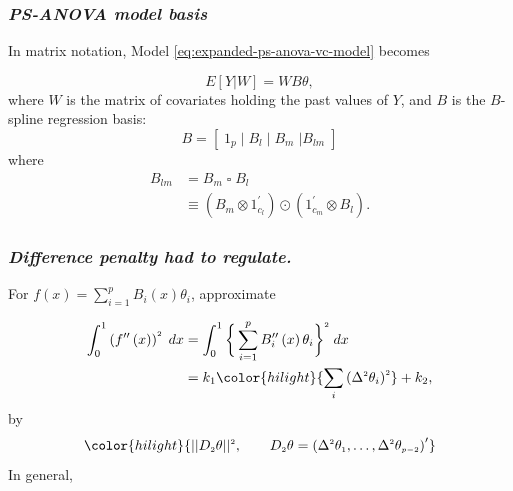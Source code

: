 \documentclass[12pt]{beamer}
\newcommand{\newthought}[1]{{\small \color{hilight} {#1}}}
\newcommand{\newmaththought}[1]{{ \color{hilight} {#1}}}
\newcommand{\ms}{\scriptscriptstyle}
\begin{document}
\begin{frame}
\frametitle{\emph{PS-ANOVA model basis}}

In matrix notation, Model \ref{eq:expanded-ps-anova-vc-model} becomes

\begin{equation*}  
E \left[ Y | W \right] = WB \theta,
\end{equation*}
\noindent
where $W$ is the matrix of covariates holding the past values of $Y$, and $B$ is the $B$-spline regression basis:
\begin{equation} \label{eq:SANOVA-basis-matrix}
B = \left[\; 1_p \; \vert \;  B_l  \; \vert \;   B_m \; \vert B_{lm} \; \right]
\end{equation}
\noindent
where 
\begin{align*} \label{eq:rowwise-kronecker-product}
B_{lm} &= B_m \; \square \; B_l \\
&\equiv \left( B_m \otimes 1^\prime_{c_l} \right) \odot \left(1^\prime_{c_m} \otimes  B_l  \right).
\end{align*}
\end{frame}






\begin{frame}
\frametitle{\emph{Difference penalty had to regulate.}}

For $f\left(x\right)=\sum \limits_{i=1}^{p} B_{i}\left(x\right) \theta_{i}$, approximate

\begin{align}
\begin{split}
\int_0^1 \left(f^{\prime \prime}\left(x\right)\right)^{\ms 2} \;dx &= \int_0^1 \bigg\{ \sum \limits_{i=1}^{p} B^{\prime \prime}_{i}\left(x\right) \theta_{i} \bigg\}^{\ms 2} \;dx \\ 
&= k_1 \newmaththought{\sum_i \left( \Delta^{\ms 2} \theta_i \right)^{\ms 2}} + k_2, 
\end{split}
\end{align}
\noindent
by
\[
\newmaththought{\vert \vert D_{\ms 2} \theta \vert \vert^{\ms 2}, \qquad  D_{\ms 2} \theta= \left( \Delta^{\ms 2}\theta_{\ms 1},\dots,\Delta^{\ms 2}\theta_{\ms{p-2}} \right)^\prime }
\]
In general, 
\framebox{\newthought{approximate} $\newmaththought{\int \limits_{\ms 0}^{\ms 1} \big(f^{\ms{\left(d\right)}}\big)^{\ms 2}\;dx}$ \newthought{with} $\newmaththought{\vert \vert D_{\ms d} \theta \vert \vert^{\ms 2} }$ }
\end{frame}
\end{document}
